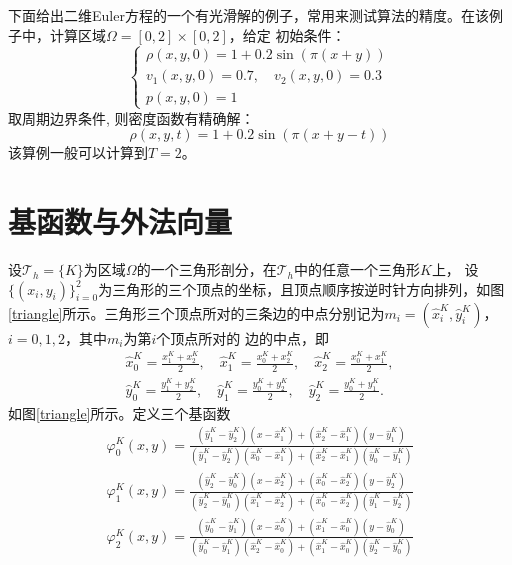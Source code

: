 \documentclass[a4paper, 12pt, UTF8]{ctexart}
\begin{document}
下面给出二维Euler方程的一个有光滑解的例子，常用来测试算法的精度。在该例子中，计算区域$\Omega=[0,2] \times[0,2]$，给定 
初始条件： 
\begin{equation}
\begin{cases}
	   \rho(x, y, 0)=1+0.2 \sin (\pi(x+y)) \\
	   v_{1}(x, y, 0)=0.7, \quad v_{2}(x, y, 0)=0.3  \\
	   p(x, y, 0)=1 
    \end{cases}
\end{equation}
取周期边界条件, 则密度函数有精确解：
$$\rho(x, y, t)=1+0.2 \sin (\pi(x+y-t))$$
该算例一般可以计算到$T = 2$。




\section{基函数与外法向量}
设$\mathcal T_h=\{K\}$为区域$\Omega$的一个三角形剖分，在$\mathcal T_h$中的任意一个三角形$K$上， 设$\{(x_i, y_i)\}_{i=0}^2$为三角形的三个顶点的坐标，且顶点顺序按逆时针方向排列，如图\ref{triangle}所示。三角形三个顶点所对的三条边的中点分别记为$m_{i}=\left(\hat{x}_{i}^K, \hat{y}_{i}^K\right)$，$i=0, 1, 2$，其中$m_i$为第$i$个顶点所对的
边的中点，即
\begin{equation}
\begin{split}
\hat x_0^K=\frac{x_1^K+x_2^K}{2},\quad  \hat x_1^K=\frac{x_0^K+x_2^K}{2},\quad\hat x_2^K=\frac{x_0^K+x_1^K}{2},\\
 \hat y_0^K=\frac{y_1^K+y_2^K}{2},\quad\hat y_1^K=\frac{y_0^K+y_2^K}{2},\quad  \hat y_2^K=\frac{y_0^K+y_1^K}{2}.
\end{split}
\end{equation}
如图\ref{triangle}所示。定义三个基函数
\begin{equation}
\begin{split}
\displaystyle \varphi_{0}^K(x, y)=\frac{\left(\hat{y}_{1}^K-\hat{y}_{2}^K\right)\left(x-\hat{x}_{1}^K\right)+\left(\hat{x}_{2}^K-\hat{x}_{1}^K\right)\left(y-\hat{y}_{1}^K\right)}{\left(\hat{y}_{1}^K-\hat{y}_{2}^K\right)\left(\hat{x}_{0}^K-\hat{x}_{1}^K\right)+\left(\hat{x}_{2}^K-\hat{x}_{1}^K\right)\left(\hat{y}_{0}^K-\hat{y}_{1}^K\right)}\\
 \varphi_{1}^K(x, y)=\frac{\left(\hat{y}_{2}^K-\hat{y}_{0}^K\right)\left(x-\hat{x}^K_{2}\right)+\left(\hat{x}^K_{0}-\hat{x}_{2}^K\right)\left(y-\hat{y}^K_{2}\right)}{\left(\hat{y}_{2}^K-\hat{y}_{0}^K\right)\left(\hat{x}_{1}^K-\hat{x}_{2}^K\right)+\left(\hat{x}_{0}^K-\hat{x}^K_{2}\right)\left(\hat{y}_{1}^K-\hat{y}_{2}^K\right)}\\
 \varphi_{2}^K(x, y)=\frac{\left(\hat{y}_{0}^K-\hat{y}_{1}^K\right)\left(x-\hat{x}^K_{0}\right)+\left(\hat{x}_{1}^K-\hat{x}^K_{0}\right)\left(y-\hat{y}_{0}^K\right)}{\left(\hat{y}_{0}^K-\hat{y}_{1}^K\right)\left(\hat{x}_{2}^K-\hat{x}_{0}^K\right)+\left(\hat{x}_{1}^K-\hat{x}_{0}^K\right)\left(\hat{y}_{2}^K-\hat{y}_{0}^K\right)}
\end{split}
\end{equation}
\end{document}
